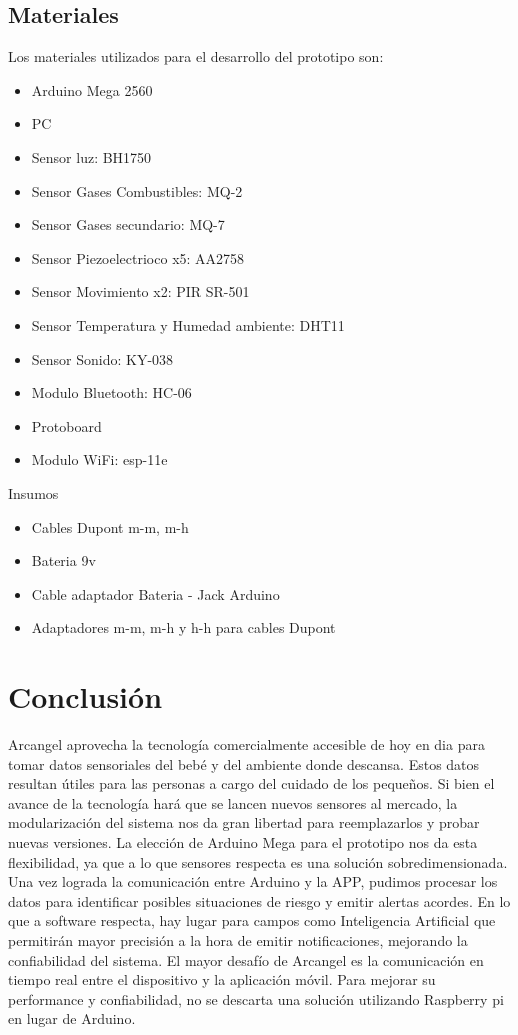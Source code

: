 \documentclass{IEEEtran}
\begin{document}


		\subsection{Materiales}
        Los materiales utilizados para el desarrollo del prototipo son:
		        \begin{itemize}
			\item Arduino Mega 2560
			\item PC
			\item Sensor luz: BH1750
			\item Sensor Gases Combustibles: MQ-2
            \item Sensor Gases secundario: MQ-7
            \item Sensor Piezoelectrioco x5: AA2758
            \item Sensor Movimiento x2: PIR SR-501
            \item Sensor Temperatura y Humedad ambiente: DHT11 
            \item Sensor Sonido: KY-038
            \item Modulo Bluetooth: HC-06
            \item Protoboard
            \item Modulo WiFi: esp-11e
		\end{itemize}
		Insumos
		\begin{itemize}
		
    		\item Cables Dupont m-m, m-h
    		\item Bateria 9v
    		\item Cable adaptador Bateria - Jack Arduino
    		\item Adaptadores m-m, m-h y h-h para cables Dupont
		
		\end{itemize}

	\section{Conclusión}

Arcangel aprovecha la tecnología comercialmente accesible de hoy en dia para tomar datos sensoriales del bebé y del ambiente donde descansa. Estos datos resultan útiles para las personas a cargo del cuidado de los pequeños. 
Si bien el avance de la tecnología hará que se lancen nuevos sensores al mercado, la modularización del sistema nos da gran libertad para reemplazarlos y probar nuevas versiones. La elección de Arduino Mega para el prototipo nos da esta flexibilidad, ya que a lo que sensores respecta es una solución sobredimensionada.
Una vez lograda la comunicación entre Arduino y la APP, pudimos procesar los datos para identificar posibles situaciones de riesgo y emitir alertas acordes.
En lo que a software respecta, hay lugar para campos como Inteligencia Artificial que permitirán mayor precisión a la hora de emitir notificaciones, mejorando la confiabilidad del sistema.
El mayor desafío de Arcangel es la comunicación en tiempo real entre el dispositivo y la aplicación móvil. Para mejorar su performance y confiabilidad, no se descarta una solución utilizando Raspberry pi en lugar de Arduino.
\end{document}

